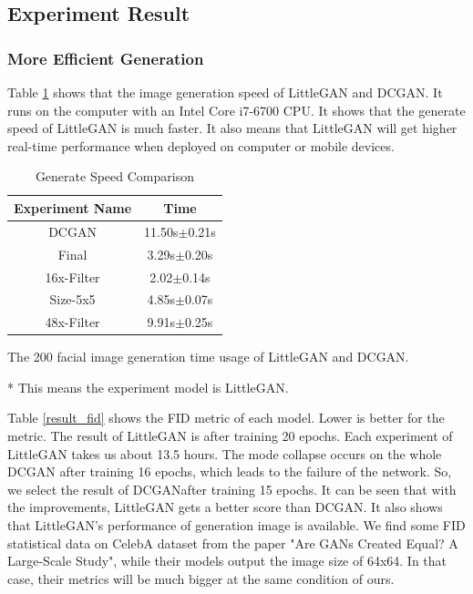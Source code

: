 \subsection{Experiment Result}
\subsubsection*{More Efficient Generation}


Table \ref{result_speed} shows that the image generation speed of LittleGAN and DCGAN.
It runs on the computer with an Intel Core i7-6700 CPU.
It shows that the generate speed of LittleGAN is much faster.
It also means that LittleGAN will get higher real-time performance when deployed on computer or mobile devices.

\begin{table}
    \caption{Generate Speed Comparison}
    \label{result_speed}
    \centering 
    
    \begin{threeparttable}
        \begin{tabular}{c|c}
            \hline
            Experiment Name & Time       \\ \hline
            DCGAN        &  11.50s$\pm$0.21s\\
            Final\tnote{*}        &  3.29s$\pm$0.20s\\
            16x-Filter\tnote{*}        & 2.02$\pm$0.14s \\
            Size-5x5\tnote{*}        &  4.85s$\pm$0.07s\\
            48x-Filter\tnote{*}        & 9.91s$\pm$0.25s  \\ \hline
        \end{tabular}

        \begin{tablenotes}
            \item The 200 facial image generation time usage of LittleGAN and DCGAN.
            \item[*] This means the experiment model is LittleGAN.
        \end{tablenotes}
    \end{threeparttable}
\end{table}
Table \ref{result_fid} shows the FID metric of each model.
Lower is better for the metric.
The result of LittleGAN is after training 20 epochs.
Each experiment of LittleGAN takes us about 13.5 hours.
The mode collapse occurs on the whole DCGAN after training 16 epochs,
    which leads to the failure of the network.
    So, we select the result of DCGANafter training 15 epochs.
It can be seen that with the improvements,
    LittleGAN gets a better score than DCGAN.
    It also shows that LittleGAN's performance of generation image is available.
We find some FID statistical data on CelebA dataset from the paper "Are GANs Created Equal? A Large-Scale Study",
    while their models output the image size of 64x64.
In that case, their metrics will be much bigger at the same condition of ours.

